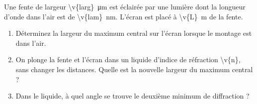 Une fente de largeur \qty{\v{larg}}{\micro\metre} est éclairée par une lumière dont la longueur d'onde dans l'air est de \qty{\v{lam}}{nm}. L'écran est placé à \qty{\v{L}}{m} de la fente.

\begin{enumerate}[label=\alph*)]
    \item Déterminez la largeur du maximum central sur l'écran lorsque le montage est dans l'air.
    \item On plonge la fente et l'écran dans un liquide d'indice de réfraction \num{\v{n}}, sans changer les distances. Quelle est la nouvelle largeur du maximum central ?
    \item Dans le liquide, à quel angle se trouve le deuxième minimum de diffraction ?
\end{enumerate}
